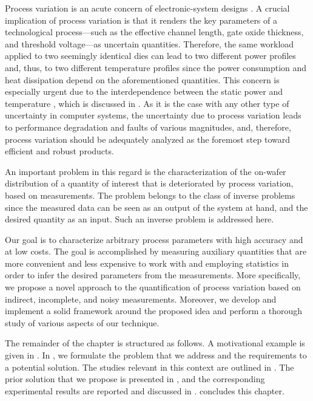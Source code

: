 Process variation is an acute concern of electronic-system designs
\cite{chandrakasan2000, srivastava2010}. A crucial implication of process
variation is that it renders the key parameters of a technological
process---such as the effective channel length, gate oxide thickness, and
threshold voltage---as uncertain quantities. Therefore, the same workload
applied to two seemingly identical dies can lead to two different power profiles
and, thus, to two different temperature profiles since the power consumption and
heat dissipation depend on the aforementioned quantities. This concern is
especially urgent due to the interdependence between the static power and
temperature \cite{liu2007, srivastava2010}, which is discussed in
. As it is the case with any other type of uncertainty in
computer systems, the uncertainty due to process variation leads to performance
degradation and faults of various magnitudes, and, therefore, process variation
should be adequately analyzed as the foremost step toward efficient and robust
products.

An important problem in this regard is the characterization of the on-wafer
distribution of a quantity of interest that is deteriorated by process
variation, based on measurements. The problem belongs to the class of inverse
problems since the measured data can be seen as an output of the system at hand,
and the desired quantity as an input. Such an inverse problem is addressed here.

Our goal is to characterize arbitrary process parameters with high accuracy and
at low costs. The goal is accomplished by measuring auxiliary quantities that
are more convenient and less expensive to work with and employing statistics in
order to infer the desired parameters from the measurements. More specifically,
we propose a novel approach to the quantification of process variation based on
indirect, incomplete, and noisy measurements. Moreover, we develop and implement
a solid framework around the proposed idea and perform a thorough study of
various aspects of our technique.

The remainder of the chapter is structured as follows. A motivational example is
given in . In , we formulate the
problem that we address and the requirements to a potential solution. The
studies relevant in this context are outlined in . The
prior solution that we propose is presented in , and
the corresponding experimental results are reported and discussed in
.  concludes this chapter.


